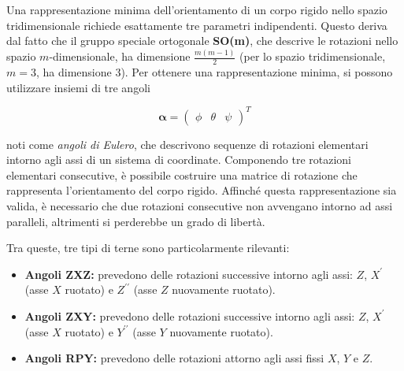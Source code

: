 \documentclass[11pt, a4paper]{article}
\begin{document}

\begin{par}
\begin{flushleft}
Una rappresentazione minima dell'orientamento di un corpo rigido nello spazio tridimensionale richiede esattamente tre parametri indipendenti. Questo deriva dal fatto che il gruppo speciale ortogonale \textbf{SO(m)}, che descrive le rotazioni nello spazio $m$-dimensionale, ha dimensione $\frac{m(m-1)}{2}$ (per lo spazio tridimensionale, $m=3$, ha dimensione $3$). Per ottenere una rappresentazione minima, si possono utilizzare insiemi di tre angoli
\end{flushleft}
\end{par}

\begin{par}
$$\boldsymbol{\alpha}={\left(\begin{array}{ccc}
\phi  & \theta  & \psi
\end{array}\right)}^T$$
\end{par}

\begin{par}
\begin{flushleft}
noti come \textit{angoli di Eulero}, che descrivono sequenze di rotazioni elementari intorno agli assi di un sistema di coordinate. Componendo tre rotazioni elementari consecutive, è possibile costruire una matrice di rotazione che rappresenta l'orientamento del corpo rigido. Affinché questa rappresentazione sia valida, è necessario che due rotazioni consecutive non avvengano intorno ad assi paralleli, altrimenti si perderebbe un grado di libertà.
\end{flushleft}
\end{par}

\begin{par}
\begin{flushleft}
Tra queste, tre tipi di terne sono particolarmente rilevanti:
\end{flushleft}
\end{par}

\begin{itemize}
\setlength{\itemsep}{-1ex}
   \item{\begin{flushleft} \textbf{Angoli ZXZ:} prevedono delle rotazioni successive intorno agli assi: $Z$, $X^{\prime }$ (asse $X$ ruotato) e $Z^{\prime \prime }$ (asse $Z$ nuovamente ruotato). \end{flushleft}}
   \item{\begin{flushleft} \textbf{Angoli ZXY:} prevedono delle rotazioni successive intorno agli assi: $Z$, $X^{\prime }$ (asse $X$ ruotato) e $Y^{\prime \prime }$ (asse $Y$ nuovamente ruotato). \end{flushleft}}
   \item{\begin{flushleft} \textbf{Angoli RPY:} prevedono delle rotazioni attorno agli assi fissi $X$, $Y$ e $Z$. \end{flushleft}}
\end{itemize}
\end{document}
